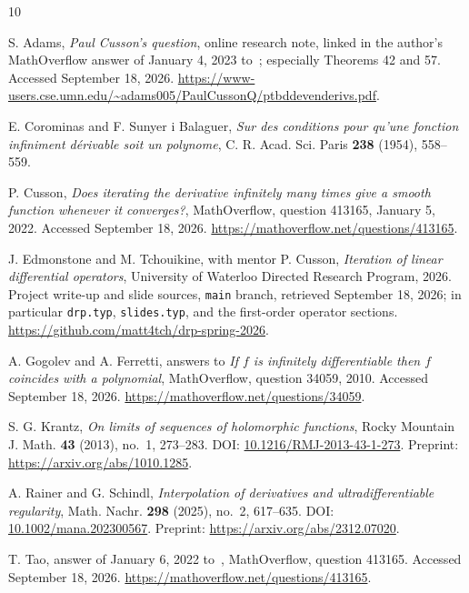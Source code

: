 \documentclass[11pt,reqno]{amsart}
\numberwithin{equation}{section}
\theoremstyle{definition}
\theoremstyle{remark}
\begin{document}
\clearpage
\begin{thebibliography}{10}

S. Adams, \emph{Paul Cusson's question}, online research note, linked in the author's MathOverflow answer of January 4, 2023 to~\cite{cusson}; especially Theorems 42 and 57. Accessed September 18, 2026.
\url{https://www-users.cse.umn.edu/~adams005/PaulCussonQ/ptbddevenderivs.pdf}.

E. Corominas and F. Sunyer i Balaguer, \emph{Sur des conditions pour qu'une fonction infiniment d\'erivable soit un polynome}, C. R. Acad. Sci. Paris \textbf{238} (1954), 558--559.

P. Cusson, \emph{Does iterating the derivative infinitely many times give a smooth function whenever it converges?}, MathOverflow, question 413165, January 5, 2022. Accessed September 18, 2026.
\url{https://mathoverflow.net/questions/413165}.

J. Edmonstone and M. Tchouikine, with mentor P. Cusson, \emph{Iteration of linear differential operators}, University of Waterloo Directed Research Program, 2026. Project write-up and slide sources, \texttt{main} branch, retrieved September 18, 2026; in particular \texttt{drp.typ}, \texttt{slides.typ}, and the first-order operator sections.
\url{https://github.com/matt4tch/drp-spring-2026}.

A. Gogolev and A. Ferretti, answers to \emph{If $f$ is infinitely differentiable then $f$ coincides with a polynomial}, MathOverflow, question 34059, 2010. Accessed September 18, 2026.
\url{https://mathoverflow.net/questions/34059}.

S. G. Krantz, \emph{On limits of sequences of holomorphic functions}, Rocky Mountain J. Math. \textbf{43} (2013), no.~1, 273--283. DOI: \href{https://doi.org/10.1216/RMJ-2013-43-1-273}{10.1216/RMJ-2013-43-1-273}. Preprint: \url{https://arxiv.org/abs/1010.1285}.

A. Rainer and G. Schindl, \emph{Interpolation of derivatives and ultradifferentiable regularity}, Math. Nachr. \textbf{298} (2025), no.~2, 617--635. DOI: \href{https://doi.org/10.1002/mana.202300567}{10.1002/mana.202300567}. Preprint: \url{https://arxiv.org/abs/2312.07020}.

T. Tao, answer of January 6, 2022 to~\cite{cusson}, MathOverflow, question 413165. Accessed September 18, 2026.
\url{https://mathoverflow.net/questions/413165}.

\end{thebibliography}
\end{document}
